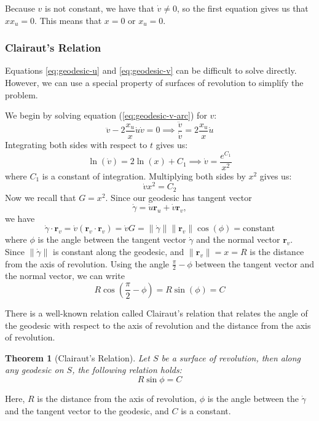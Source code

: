\documentclass[12pt]{article}
\newtheorem{theorem}[definition]{Theorem}
\begin{document}
Because $v$ is not constant, we have that $\dot{v} \neq 0$, so the first equation gives us that $x x_{u} = 0$.
This means that $x = 0$ or $x_{u} = 0$.

\begingroup 
\color{blue}
\subsubsection{Clairaut’s Relation}

Equations \eqref{eq:geodesic-u} and \eqref{eq:geodesic-v} can be difficult to solve directly.
However, we can use a special property of surfaces of revolution to simplify the problem.

We begin by solving equation (\ref{eq:geodesic-v-arc}) for \(v\):
\[
\ddot{v} - 2\frac{x_{u}}{x}\dot{u}\dot{v} = 0 \implies \frac{\ddot{v}}{\dot{v}} = 2\frac{x_{u}}{x}\dot{u}
\]
Integrating both sides with respect to \(t\) gives us:
\[
\ln(\dot{v}) = 2\ln(x) + C_1 \implies \dot{v} = \frac{e^{C_1}}{x^2}
\]
where \(C_1\) is a constant of integration.
Multiplying both sides by \(x^2\) gives us:
\[
\dot{v} x^2 = C_2
\]
Now we recall that \(G = x^2\). 
Since our geodesic has tangent vector 
\[
\dot{\gamma} = \dot{u}\mathbf{r}_u + \dot{v}\mathbf{r}_v,
\]
we have 
\[
	\dot{\gamma} \cdot \mathbf{r}_v = \dot{v} (\mathbf{r}_v \cdot \mathbf{r}_v) = \dot{v} G = \|\dot{\gamma}\|\|\mathbf{r}_v\|\cos(\phi) = \text{constant}
\]
where \(\phi\) is the angle between the tangent vector \(\dot{\gamma}\) and the normal vector \(\mathbf{r}_v\).
Since \(\|\dot{\gamma}\|\) is constant along the geodesic, and \(\|\mathbf{r}_v\| = x = R\) is the distance from the axis of revolution.
Using the angle \(\frac{\pi}{2} - \phi\) between the tangent vector and the normal vector, we can write
\[
R\cos(\frac{\pi}{2} - \phi) = R\sin(\phi) = C
\]

There is a well-known relation called Clairaut's relation that relates the angle of the geodesic with respect to the axis of revolution and the distance from the axis of revolution.
\endgroup 

\begin{theorem}[Clairaut's Relation]
Let \(S\) be a surface of revolution, then along any geodesic on \(S\), the following relation holds:
\[
R\sin\phi = C
\]
\end{theorem}
Here, \(R\) is the distance from the axis of revolution, \(\phi\) is the angle between the $\dot{\gamma}$ and the tangent vector to the geodesic, and \(C\) is a constant.
\end{document}
